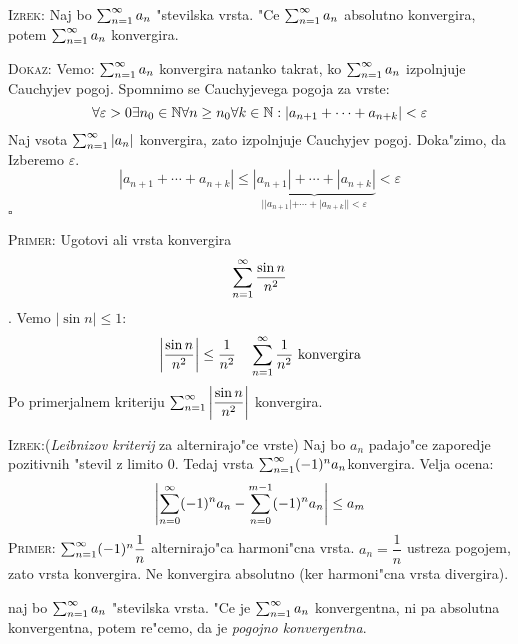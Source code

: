 \textsc{Izrek:} Naj bo $\sum_{n = 1}^{\infty}a_n$ "stevilska vrsta. "Ce $\sum_{n = 1}^{\infty}a_n$ absolutno konvergira, potem $\sum_{n = 1}^{\infty}a_n$ konvergira.

\textsc{Dokaz:} Vemo: $\sum_{n = 1}^{\infty}a_n$ konvergira natanko takrat, ko $\sum_{n = 1}^{\infty}a_n$ izpolnjuje Cauchyjev pogoj. Spomnimo se Cauchyjevega pogoja za vrste:
\begin{equation*}
\forall \varepsilon > 0 \exists n_0 \in \mathbb{N} \forall n \geq n_0 \forall k \in \mathbb{N}: |a_{n+1} + \cdots + a_{n+k}| < \varepsilon
\end{equation*}
Naj vsota $\sum_{n = 1}^{\infty}|a_n|$ konvergira, zato izpolnjuje Cauchyjev pogoj. Doka"zimo, da \\
Izberemo $\varepsilon$.
\begin{equation*}
|a_{n+1} + \cdots + a_{n+k}| \leq \underbrace{|a_{n+1}| + \cdots + |a_{n+k}|}_{||a_{n+1}| + \cdots + |a_{n+k}|| < \varepsilon} < \varepsilon
\end{equation*}
\hfill $\square$

\textsc{Primer:} Ugotovi ali vrsta konvergira
\begin{equation*}
\sum_{n = 1}^{\infty}\dfrac{\sin n}{n^2}
\end{equation*}
. Vemo $|\sin n| \leq 1$:
\begin{equation*}
\left|\dfrac{\sin n}{n^2}\right| \leq \dfrac{1}{n^2} \quad \sum_{n = 1}^{\infty}\dfrac{1}{n^2} \text{ konvergira}
\end{equation*}
Po primerjalnem kriteriju $\sum_{n = 1}^{\infty}\left|\dfrac{\sin n}{n^2}\right|$ konvergira.

\textsc{Izrek:}(\emph{Leibnizov kriterij} za alternirajo"ce vrste) Naj bo $a_n$ padajo"ce zaporedje pozitivnih "stevil z limito 0. Tedaj vrsta $\sum_{n = 1}^{\infty}(-1)^na_n$konvergira. Velja ocena:
\begin{equation*}
\left|\sum_{n = 0}^{\infty}(-1)^n a_n - \sum_{n=0}^{m-1}(-1)^n a_n\right| \leq a_m
\end{equation*}
\textsc{Primer:} $\sum_{n = 1}^{\infty}(-1)^n\dfrac{1}{n}$ alternirajo"ca harmoni"cna vrsta. $a_n = \dfrac{1}{n}$ ustreza pogojem, zato vrsta konvergira. Ne konvergira absolutno (ker harmoni"cna vrsta divergira).

 naj bo $\sum_{n = 1}^{\infty}a_n$ "stevilska vrsta. "Ce je $\sum_{n = 1}^{\infty}a_n$ konvergentna, ni pa absolutna konvergentna, potem re"cemo, da je \emph{pogojno konvergentna}.

